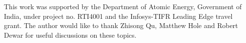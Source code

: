 This work was supported by the Department of Atomic Energy, Government of India, under project no. RTI4001 and the Infosys-TIFR Leading Edge travel grant. The author would like to thank Zhisong Qu, Matthew Hole and Robert Dewar for useful discussions on these topics.